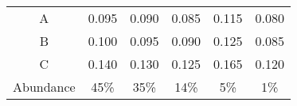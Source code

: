 \begin{tabular}{cccccc}
   \hline
A & 0.095 & 0.090 & 0.085 & 0.115 & 0.080 \\ 
  B & 0.100 & 0.095 & 0.090 & 0.125 & 0.085 \\ 
  C & 0.140 & 0.130 & 0.125 & 0.165 & 0.120 \\ 
  Abundance & 45\% & 35\% & 14\% & 5\% & 1\% \\ 
   \hline
\end{tabular}
